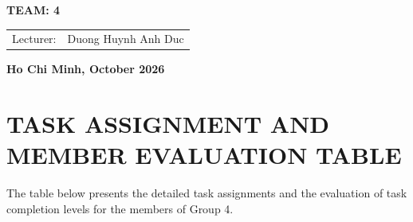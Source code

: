 \documentclass[12pt, a4paper, oneside]{article}
\begin{document}
\begin{titlepage}
\begin{center}
    \vspace{15pt}
 \textbf{TEAM: 4}
\end{center}

\vspace{10pt}

\begin{table}[h]
\centering
\begin{tabular}{rl}
Lecturer: & Duong Huynh Anh Duc\\
\end{tabular}
\end{table}







\vfill
\centerline{\bf Ho Chi Minh, October 2026}

\vspace{1cm}
\end{titlepage}

\newpage
\section*{TASK ASSIGNMENT AND MEMBER EVALUATION TABLE}

The table below presents the detailed task assignments and the evaluation of task completion levels for the members of Group 4.

\vspace{0.5cm}
\end{document}
